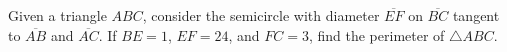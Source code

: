 Given a triangle $ABC$, consider the semicircle with diameter $\overline{EF}$ on $\overline{BC}$ tangent to $\overline{AB}$ and $\overline{AC}$. If $BE=1$, $EF=24$, and $FC=3$, find the perimeter of $\triangle{ABC}$.

